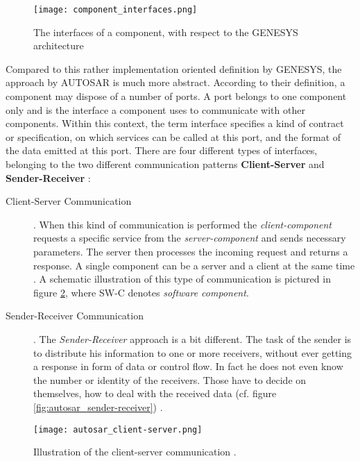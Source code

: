 \begin{figure}[!htbp]
\centering
\texttt{[image: component\_interfaces.png]}
\caption{The interfaces of a component, with respect to the GENESYS architecture \cite[p.40]{genesys}}
\label{fig:component_interfaces}
\end{figure}

Compared to this rather implementation oriented definition by GENESYS, the approach by AUTOSAR is much more abstract. According to their definition, a component may dispose of a number of ports. A port belongs to one component only and is the interface a component uses to communicate with other components. Within this context, the term interface specifies a kind of contract or specification, on which services can be called at this port, and the format of the data emitted at this port. There are four different types of interfaces, belonging to the two different communication patterns \textbf{Client-Server} and \textbf{Sender-Receiver} \cite{autosar_intro}:

\begin{description}
\item [Client-Server Communication].
When this kind of communication is performed the \emph{client-component} requests a specific service from the \emph{server-component} and sends necessary parameters. The server then processes the incoming request and returns a response. A single component can be a server and a client at the same time \cite{autosar_intro}. A schematic illustration of this type of communication is pictured in figure \ref{fig:autosar_client-server}, where SW-C denotes \emph{software component}.

\item [Sender-Receiver Communication].
The \emph{Sender-Receiver} approach is a bit different. The task of the sender is to distribute his information to one or more receivers, without ever getting a response in form of data or control flow. In fact he does not even know the number or identity of the receivers. Those have to decide on themselves, how to deal with the received data (cf. figure \ref{fig:autosar_sender-receiver}) \cite{autosar_intro}.
\end{description}

\begin{figure}[!htbp]
\centering
\texttt{[image: autosar\_client-server.png]}
\caption{Illustration of the client-server communication \cite{autosar_intro}.}
\label{fig:autosar_client-server}
\end{figure}

